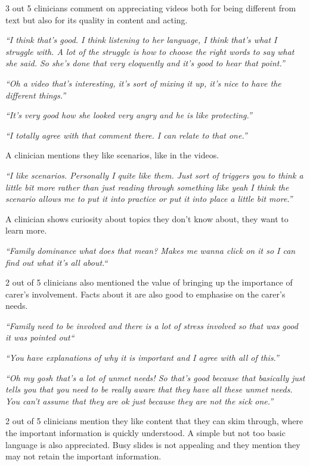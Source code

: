 \documentclass{sigchi}
\begin{document}
3 out 5 clinicians comment on appreciating videos both for being different from text but also for its quality in content and acting.

\textit{“I think that’s good. I think listening to her language, I think that’s what I struggle with. A lot of the struggle is how to choose the right words to say what she said. So she’s done that very eloquently and it’s good to hear that point.”}

\textit{“Oh a video that’s interesting, it’s sort of mixing it up, it’s nice to have the different things.”}

\textit{“It’s very good how she looked very angry and he is like protecting.”}

\textit{“I totally agree with that comment there. I can relate to that one.”}

A clinician mentions they like scenarios, like in the videos.

\textit{“I like scenarios. Personally I quite like them. Just sort of triggers you to think a little bit more rather than just reading through something like yeah I think the scenario allows me to put it into practice or put it into place a little bit more.”}

A clinician shows curiosity about topics they don’t know about, they want to learn more.

\textit{“Family dominance what does that mean? Makes me wanna click on it so I can find out what it’s all about.“}

2 out of 5 clinicians also mentioned the value of bringing up the importance of carer’s involvement. Facts about it are also good to emphasise on the carer’s needs.

\textit{“Family need to be involved and there is a lot of stress involved so that was good it was pointed out“}

\textit{“You have explanations of why it is important and I agree with all of this.”} 

\textit{“Oh my gosh that’s a lot of unmet needs! So that’s good because that basically just tells you that you need to be really aware that they have all these unmet needs. You can’t assume that they are ok just because they are not the sick one.”}

2 out of 5 clinicians mention they like content that they can skim through, where the important information is quickly understood. A simple but not too basic language is also appreciated. Busy slides is not appealing and they mention they may not retain the important information.
\end{document}
